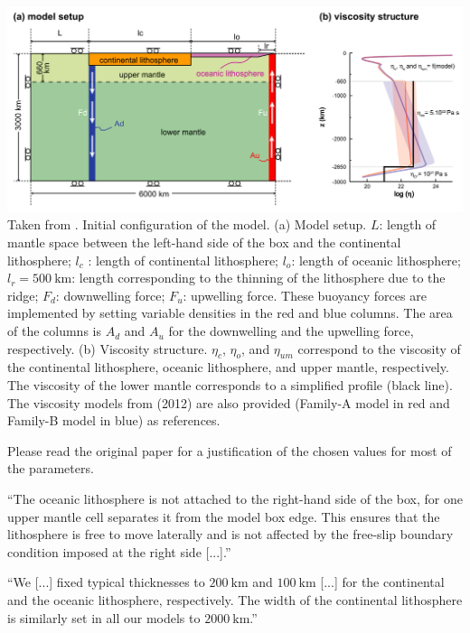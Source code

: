 \begin{center}
\includegraphics[width=15cm]{python_codes/fieldstone_143/images/yahb13_a}\\
{\captionfont 
Taken from \cite{yahb13}. Initial configuration of the model. 
(a) Model setup. $L$: length of mantle space between the left-hand 
side of the box and the continental lithosphere; $l_c$ : length of continental lithosphere; 
$l_o$: length of oceanic lithosphere; 
$l_r=500~\si{\km}$: length corresponding to the thinning of the lithosphere due to the ridge; 
$F_d$: downwelling force; 
$F_u$: upwelling force. These buoyancy forces are implemented by setting variable
densities in the red and blue columns. The area of the columns is $A_d$ and $A_u$ for the downwelling and the
upwelling force, respectively. (b) Viscosity structure. $\eta_c$, $\eta_o$, and $\eta_{um}$ correspond
to the viscosity of the continental lithosphere, oceanic lithosphere, and upper mantle, respectively. The
viscosity of the lower mantle corresponds to a simplified profile (black line). The viscosity models from
\cite{civs12} (2012) are also provided (Family-A model in red and Family-B model in blue) as references. }
\end{center}

Please read the original paper for a justification of the chosen values for most 
of the parameters.

``The oceanic lithosphere is not attached
to the right-hand side of the box, for one upper mantle cell
separates it from the model box edge. This ensures that the
lithosphere is free to move laterally and is not affected by
the free-slip boundary condition imposed at the right side [...].''

``We [...] fixed typical thicknesses to
$200~\si{\km}$ and $100~\si{\km}$ [...] for the continental and the oceanic lithosphere, 
respectively. The width of the continental lithosphere is similarly
set in all our models to $2000~\si{\km}$.''


